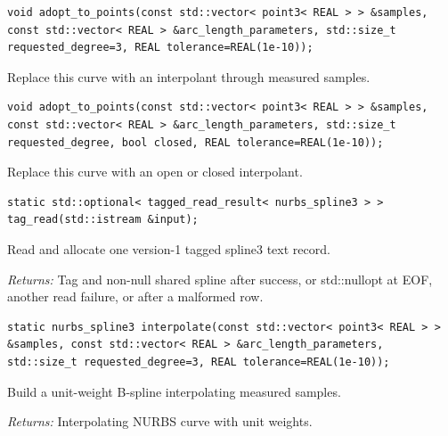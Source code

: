 \par\noindent\begin{minipage}{\linewidth}
\begin{lstlisting}[style=apireference]
void adopt_to_points(const std::vector< point3< REAL > > &samples, const std::vector< REAL > &arc_length_parameters, std::size_t requested_degree=3, REAL tolerance=REAL(1e-10));
\end{lstlisting}
{\footnotesize Replace this curve with an interpolant through measured samples.\par}
\end{minipage}\par\vspace{1pt}
\par\noindent\begin{minipage}{\linewidth}
\begin{lstlisting}[style=apireference]
void adopt_to_points(const std::vector< point3< REAL > > &samples, const std::vector< REAL > &arc_length_parameters, std::size_t requested_degree, bool closed, REAL tolerance=REAL(1e-10));
\end{lstlisting}
{\footnotesize Replace this curve with an open or closed interpolant.\par}
\end{minipage}\par\vspace{1pt}
\par\noindent\begin{minipage}{\linewidth}
\begin{lstlisting}[style=apireference]
static std::optional< tagged_read_result< nurbs_spline3 > > tag_read(std::istream &input);
\end{lstlisting}
{\footnotesize Read and allocate one version-1 tagged spline3 text record.\par}
{\footnotesize\textit{Returns:} Tag and non-null shared spline after success, or std::nullopt at EOF, another read failure, or after a malformed row.\par}
\end{minipage}\par\vspace{1pt}
\par\noindent\begin{minipage}{\linewidth}
\begin{lstlisting}[style=apireference]
static nurbs_spline3 interpolate(const std::vector< point3< REAL > > &samples, const std::vector< REAL > &arc_length_parameters, std::size_t requested_degree=3, REAL tolerance=REAL(1e-10));
\end{lstlisting}
{\footnotesize Build a unit-weight B-spline interpolating measured samples.\par}
{\footnotesize\textit{Returns:} Interpolating NURBS curve with unit weights.\par}
\end{minipage}\par\vspace{1pt}
